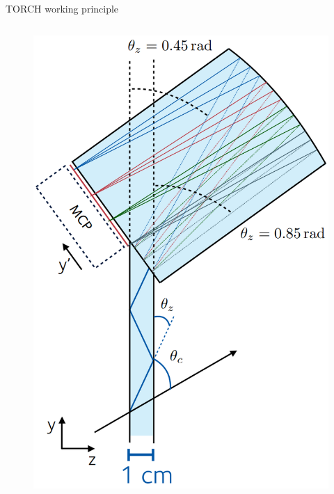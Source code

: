 \documentclass[xcolor={dvipsnames}]{beamer}
\begin{document}
\begin{frame}{TORCH working principle}
\begin{columns}
\begin{column}{0.35\textwidth}
\begin{figure}
        \includegraphics[width = 1.0\textwidth]{Figs/TORCH_SideView.png}
      \end{figure}
    \end{column}
  \end{columns}
\end{frame}
\end{document}
